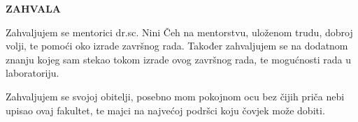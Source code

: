\begin{center}
	\textbf{ZAHVALA}
\end{center}

Zahvaljujem se mentorici dr.sc. Nini Čeh na mentorstvu, uloženom trudu, dobroj volji, te pomoći oko izrade završnog rada. Također zahvaljujem se na dodatnom znanju kojeg sam stekao tokom izrade ovog završnog rada, te mogućnosti rada u laboratoriju.

Zahvaljujem se svojoj obitelji, posebno mom pokojnom ocu bez čijih priča nebi upisao ovaj fakultet, te majci na najvećoj podršci koju čovjek može dobiti.
